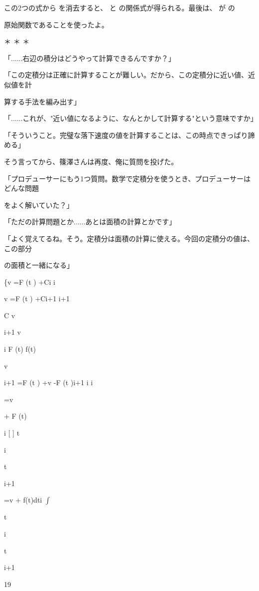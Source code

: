 この2つの式から を消去すると、 と の関係式が得られる。最後は、 が の\par
原始関数であることを使ったよ。\par
＊ ＊ ＊\par
「......右辺の積分はどうやって計算できるんですか？」\par
「この定積分は正確に計算することが難しい。だから、この定積分に近い値、近似値を計\par
算する⼿法を編み出す」\par
「......これが、"近い値になるように、なんとかして計算する"という意味ですか」\par
「そういうこと。完璧な落下速度の値を計算することは、この時点できっぱり諦める」\par
そう⾔ってから、篠澤さんは再度、俺に質問を投げた。\par
「プロデューサーにもう1つ質問。数学で定積分を使うとき、プロデューサーはどんな問題\par
をよく解いていた？」\par
「ただの計算問題とか......あとは⾯積の計算とかです」\par
「よく覚えてるね。そう。定積分は⾯積の計算に使える。今回の定積分の値は、この部分\par
の⾯積と⼀緒になる」\par
\{v  =F (t  ) +Ci i\par
v  =F (t  ) +Ci+1 i+1\par
C v\par
i+1 v\par
i F (t) f(t)\par
v\par
i+1 =F (t  ) +v  -F (t  )i+1 i i\par
=v\par
+ F (t)\par
i [ ] t\par
i\par
t\par
i+1\par
=v  +  f(t)dti $\int$\par
t\par
i\par
t\par
i+1\par
19\par

